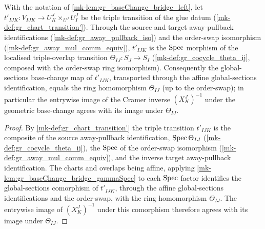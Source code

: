 \begin{lemma}\label{mk-lem:gr_baseChange_bridge_transition}
  \leanok

  With the notation of \ref{mk-lem:gr_baseChange_bridge_left}, let
  \(t'_{IJK} : V_{IJK} \to U^J_K \times_{U^J} U^J_I\) be the triple transition of the glue datum
  (\ref{mk-def:gr_chart_transition'}). Through the source and target away-pullback identifications
  (\ref{mk-def:gr_away_pullback_iso}) and the order-swap isomorphism
  (\ref{mk-def:gr_away_mul_comm_equiv}), \(t'_{IJK}\) is the \(\operatorname{Spec}\) morphism of the localised
  triple-overlap transition \(\Theta_{IJ} : S_J \to S_I\) (\ref{mk-def:gr_cocycle_theta_ij},
  composed with the order-swap ring isomorphism). Consequently the global-sections base-change
  map of \(t'_{IJK}\), transported through the affine global-sections identification, equals the
  ring homomorphism \(\Theta_{IJ}\) (up to the order-swap); in particular the entrywise image of
  the Cramer inverse \((X^J_K)^{-1}\) under the geometric base-change agrees with its image under
  \(\Theta_{IJ}\).
\end{lemma}
\begin{proof}
  By \ref{mk-def:gr_chart_transition'} the triple transition \(t'_{IJK}\) is the composite of the
  source away-pullback identification, \(\operatorname{Spec}\Theta_{IJ}\) (\ref{mk-def:gr_cocycle_theta_ij}), the
  \(\operatorname{Spec}\) of the order-swap isomorphism (\ref{mk-def:gr_away_mul_comm_equiv}), and the inverse
  target away-pullback identification. The charts and overlaps being affine, applying
  \ref{mk-lem:gr_baseChange_bridge_gammaSpec} to each \(\operatorname{Spec}\) factor identifies the global-sections
  comorphism of \(t'_{IJK}\), through the affine global-sections identifications and the order-swap,
  with the ring homomorphism \(\Theta_{IJ}\). The entrywise image of \((X^J_K)^{-1}\) under this
  comorphism therefore agrees with its image under \(\Theta_{IJ}\).
\end{proof}

